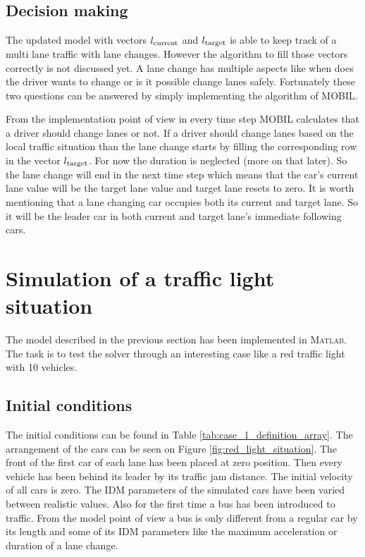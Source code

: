 		\subsection*{Decision making}
		The updated model with vectors $l_{\rm current}$ and $l_{\rm target}$ is able to keep track of a multi lane traffic with lane changes. However the algorithm to fill those vectors correctly is not discussed yet. A lane change has multiple aspects like when does the driver wants to change or is it possible change lanes safely. Fortunately these two questions can be answered by simply implementing the algorithm of MOBIL.

		From the implementation point of view in every time step MOBIL calculates that a driver should change lanes or not. If a driver should change lanes based on the local traffic situation than the lane change starts by filling the corresponding row in the vector $l_{\rm target}$. For now the duration is neglected (more on that later). So the lane change will end in the next time step which means that the car's current lane value will be the target lane value and target lane resets to zero. It is worth mentioning that a lane changing car occupies both its current and target lane. So it will be the leader car in both current and target lane's immediate following cars.
	\section{Simulation of a traffic light situation}
		The model described in the previous section has been implemented in \textsc{Matlab}. The task is to test the solver through an interesting case like a red traffic light with 10 vehicles.
		\subsection*{Initial conditions}
		The initial conditions can be found in Table \ref{tab:case_1_definition_array}. The arrangement of the cars can be seen on Figure \ref{fig:red_light_situation}. The front of the first car of each lane has been placed at zero position. Then every vehicle has been behind its leader by its traffic jam distance. The initial velocity of all cars is zero.  The IDM parameters of the simulated cars have been varied between realistic values. Also for the first time a bus has been introduced to traffic. From the model point of view a bus is only different from a regular car by its length and some of its IDM parameters like the maximum acceleration or duration of a lane change.
		
